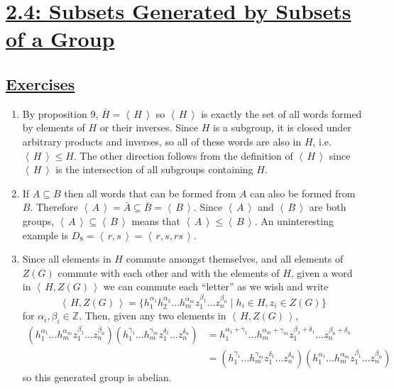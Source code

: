 \documentclass[]{article}
\newcommand{\gen}[1]{\left\langle\, #1 \,\right\rangle}
\newcommand{\bbz}{\mathbb{Z}}
\begin{document}
\section*{\underline{2.4: Subsets Generated by Subsets of a Group}}
\subsection*{\underline{Exercises}}
\begin{enumerate}

\item By proposition 9, $\bar{H} = \gen{H}$ so $\gen{H}$ is exactly the set of all words formed by elements of $H$ or their inverses. Since $H$ is a subgroup, it is closed under arbitrary products and inverses, so all of these words are also in $H$, i.e. $\gen{H} \leq H$. The other direction follows from the definition of $\gen{H}$ since $\gen{H}$ is the intersection of all subgroups containing $H$.


\item If $A \subseteq B$ then all words that can be formed from $A$ can also be formed from $B$. Therefore $\gen{A} = \bar{A} \subseteq \bar{B} = \gen{B}$. Since $\gen{A}$ and $\gen{B}$ are both groups, $\gen{A} \subseteq \gen{B}$ means that $\gen{A} \leq \gen{B}$. An uninteresting example is $D_8 = \gen{r, s} = \gen{r, s, rs}$.


\item Since all elements in $H$ commute amongst themselves, and all elements of $Z(G)$ commute with each other and with the elements of $H$, given a word in $\gen{H,Z(G)}$ we can commute each ``letter'' as we wish and write
\begin{equation}
\gen{H,Z(G)} = \{h_1^{\alpha_1}h_2^{\alpha_2}\ldots h_m^{\alpha_m}z_1^{\beta_1}\ldots z_n^{\beta_n} \mid h_i \in H, z_i \in Z(G) \}
\end{equation}
for $\alpha_i, \beta_i \in \bbz$. Then, given any two elements in $\gen{H,Z(G)}$,
\begin{align}
(h_1^{\alpha_1}\ldots h_m^{\alpha_m}z_1^{\beta_1}\ldots z_n^{\beta_n})(h_1^{\gamma_1}\ldots h_m^{\gamma_m}z_1^{\delta_1}\ldots z_n^{\delta_n}) &= h_1^{\alpha_1+\gamma_1}\ldots h_m^{\alpha_m+\gamma_m}z_1^{\beta_1+\delta_1}\ldots z_n^{\beta_n+\delta_n} \\
&= (h_1^{\gamma_1}\ldots h_m^{\gamma_m}z_1^{\delta_1}\ldots z_n^{\delta_n})(h_1^{\alpha_1}\ldots h_m^{\alpha_m}z_1^{\beta_1}\ldots z_n^{\beta_n})
\end{align}
so this generated group is abelian.


\end{enumerate}
\end{document}
